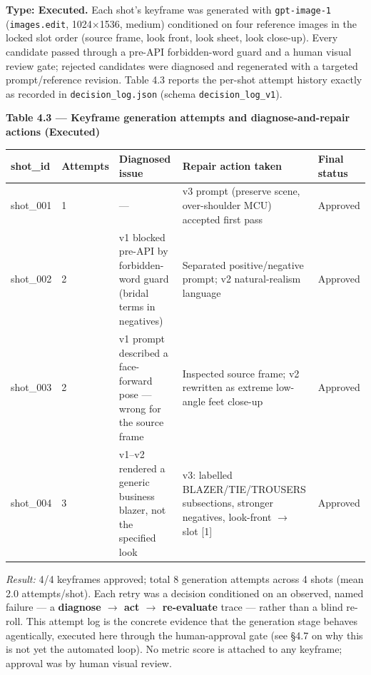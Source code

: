 \documentclass[10pt,twocolumn,letterpaper]{article}
\begin{document}
\textbf{Type: Executed.} Each shot's keyframe was generated with \texttt{gpt-image-1} (\texttt{images.edit}, 1024$\times$1536, medium) conditioned on four reference images in the locked slot order (source frame, look front, look sheet, look close-up). Every candidate passed through a pre-API forbidden-word guard and a human visual review gate; rejected candidates were diagnosed and regenerated with a targeted prompt/reference revision. Table 4.3 reports the per-shot attempt history exactly as recorded in \texttt{decision\_log.json} (schema \texttt{decision\_log\_v1}).

\begin{table}[t]
\centering
{\footnotesize\textbf{\textbf{Table 4.3 --- Keyframe generation attempts and diagnose-and-repair actions (Executed)}}}\par\vspace{3pt}
\footnotesize
\begin{tabularx}{\textwidth}{ll>{\RaggedRight\arraybackslash}X>{\RaggedRight\arraybackslash}Xl}
\toprule
shot\_id & Attempts & Diagnosed issue & Repair action taken & Final status \\
\midrule
shot\_001 & 1 & --- & v3 prompt (preserve scene, over-shoulder MCU) accepted first pass & Approved \\
shot\_002 & 2 & v1 blocked pre-API by forbidden-word guard (bridal terms in negatives) & Separated positive/negative prompt; v2 natural-realism language & Approved \\
shot\_003 & 2 & v1 prompt described a face-forward pose --- wrong for the source frame & Inspected source frame; v2 rewritten as extreme low-angle feet close-up & Approved \\
shot\_004 & 3 & v1--v2 rendered a generic business blazer, not the specified look & v3: labelled BLAZER/TIE/TROUSERS subsections, stronger negatives, look-front $\rightarrow$ slot [1] & Approved \\
\bottomrule
\end{tabularx}
\end{table}

\emph{Result:} 4/4 keyframes approved; total 8 generation attempts across 4 shots (mean 2.0 attempts/shot). Each retry was a decision conditioned on an observed, named failure --- a \textbf{diagnose $\rightarrow$ act $\rightarrow$ re-evaluate} trace --- rather than a blind re-roll. This attempt log is the concrete evidence that the generation stage behaves agentically, executed here through the human-approval gate (see \S{}4.7 on why this is not yet the automated loop). No metric score is attached to any keyframe; approval was by human visual review.
\end{document}
